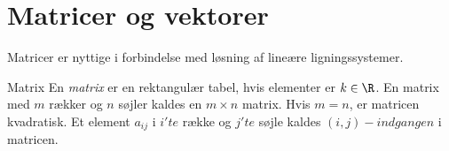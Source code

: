 \section{Matricer og vektorer}


Matricer er nyttige i forbindelse med løsning af lineære ligningssystemer. 

\begin{defn}{Matrix}{}
En \textit{matrix} er en rektangulær tabel, hvis elementer er $k \in \R$. 
En matrix med $m$ rækker og $n$ søjler kaldes en $m \times n$ matrix.
Hvis $m=n$, er matricen kvadratisk. 
Et element $a_{ij}$ i $i'te$ række og $j'te$ søjle kaldes $(i, j)-indgangen$ i matricen. 
\end{defn}


